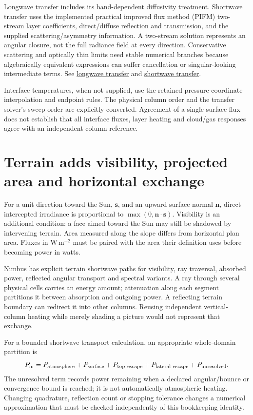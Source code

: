 Longwave transfer includes its band-dependent diffusivity treatment. Shortwave
transfer uses the implemented practical improved flux method (PIFM) two-stream
layer coefficients, direct/diffuse reflection and transmission, and the
supplied scattering/asymmetry information. A two-stream solution represents an
angular closure, not the full radiance field at every direction. Conservative
scattering and optically thin limits need stable numerical branches because
algebraically equivalent expressions can suffer cancellation or singular-looking
intermediate terms. See
\href{../src/radiation/schemes/rrtmg/rrtmg_longwave_transfer.cpp}{longwave transfer}
and \href{../src/radiation/schemes/rrtmg/rrtmg_shortwave_transfer.cpp}{shortwave transfer}.

Interface temperatures, when not supplied, use the retained pressure-coordinate
interpolation and endpoint rules. The physical column order and the transfer
solver's sweep order are explicitly converted. Agreement of a single surface
flux does not establish that all interface fluxes, layer heating and cloud/gas
responses agree with an independent column reference.

\section{Terrain adds visibility, projected area and horizontal exchange}

For a unit direction toward the Sun, $\boldsymbol s$, and an upward surface
normal $\boldsymbol n$, direct intercepted irradiance is proportional to
$\max(0,\boldsymbol n\cdot\boldsymbol s)$. Visibility is an additional condition:
a face aimed toward the Sun may still be shadowed by intervening terrain.
Area measured along the slope differs from horizontal plan area. Fluxes in
$\mathrm{W\,m^{-2}}$ must be paired with the area their definition uses before
becoming power in watts.

Nimbus has explicit terrain shortwave paths for visibility, ray traversal,
absorbed power, reflected angular transport and spectral variants. A ray through
several physical cells carries an energy amount; attenuation along each segment
partitions it between absorption and outgoing power. A reflecting terrain
boundary can redirect it into other columns. Reusing independent vertical-column
heating while merely shading a picture would not represent that exchange.

For a bounded shortwave transport calculation, an appropriate whole-domain
partition is
\[
 P_{\rm in}=P_{\rm atmosphere}+P_{\rm surface}
        +P_{\rm top\ escape}+P_{\rm lateral\ escape}+P_{\rm unresolved}.
\]
The unresolved term records power remaining when a declared angular/bounce or
convergence bound is reached; it is not automatically atmospheric heating.
Changing quadrature, reflection count or stopping tolerance changes a numerical
approximation that must be checked independently of this bookkeeping identity.

